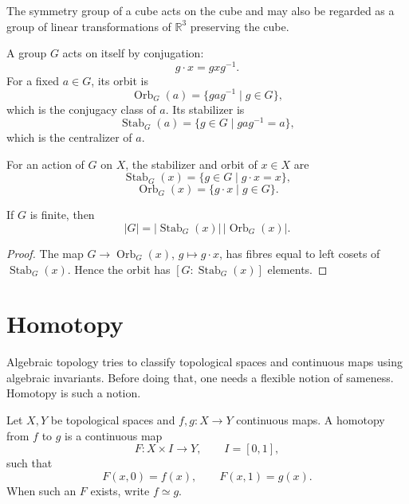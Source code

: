 \begin{example}
The symmetry group of a cube acts on the cube and may also be regarded as a group of linear transformations of \(\mathbb R^3\) preserving the cube.
\end{example}

\begin{example}[Conjugation]
A group \(G\) acts on itself by conjugation:
\[
  g\cdot x=gxg^{-1}.
\]
For a fixed \(a\in G\), its orbit is
\[
  \operatorname{Orb}_G(a)=\{gag^{-1}\mid g\in G\},
\]
which is the conjugacy class of \(a\).  Its stabilizer is
\[
  \operatorname{Stab}_G(a)=\{g\in G\mid gag^{-1}=a\},
\]
which is the centralizer of \(a\).
\end{example}

\begin{definition}
For an action of \(G\) on \(X\), the stabilizer and orbit of \(x\in X\) are
\[
  \operatorname{Stab}_G(x)=\{g\in G\mid g\cdot x=x\},
\]
\[
  \operatorname{Orb}_G(x)=\{g\cdot x\mid g\in G\}.
\]
\end{definition}

\begin{theorem}
If \(G\) is finite, then
\[
  |G|=|\operatorname{Stab}_G(x)|\,|\operatorname{Orb}_G(x)|.
\]
\end{theorem}

\begin{proof}
The map \(G\to\operatorname{Orb}_G(x)\), \(g\mapsto g\cdot x\), has fibres equal to left cosets of \(\operatorname{Stab}_G(x)\).  Hence the orbit has \([G:\operatorname{Stab}_G(x)]\) elements.
\end{proof}

\section{Homotopy}

Algebraic topology tries to classify topological spaces and continuous maps using algebraic invariants.  Before doing that, one needs a flexible notion of sameness.  Homotopy is such a notion.

\begin{definition}
Let \(X,Y\) be topological spaces and \(f,g:X\to Y\) continuous maps.  A homotopy from \(f\) to \(g\) is a continuous map
\[
  F:X\times I\to Y,\qquad I=[0,1],
\]
such that
\[
  F(x,0)=f(x),\qquad F(x,1)=g(x).
\]
When such an \(F\) exists, write \(f\simeq g\).
\end{definition}

